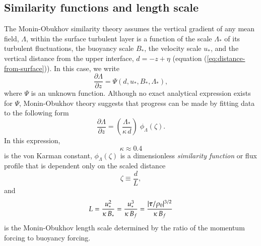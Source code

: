 \subsection{Similarity functions and length scale}
\label{subsection:m-o-similarity-functions}

The Monin-Obukhov similarity theory assumes the vertical gradient of
any mean field, $\Lambda$, within the surface turbulent layer is a
function of the scale $\Lambda_{*}$ of its turbulent fluctuations, the
buoyancy scale $B_{*}$, the velocity scale $u_{*}$, and the vertical
distance from the upper interface, $d=-z+\eta$ (equation
(\ref{eq:distance-from-surface})). In this case, we write
\begin{equation}
 \frac{\partial \Lambda}{\partial z} =  \Psi(d, u_{*}, B_{*}, \Lambda_{*}), 
\end{equation}
where $\Psi$ is an unknown function.  Although no exact analytical
expression exists for $\Psi$, Monin-Obukhov theory suggests that
progress can be made by fitting data to the following
form
\begin{equation}
  \frac{\partial \Lambda}{\partial z} = \left( \frac{\Lambda_{*}}{\kappa \, d} \right) \; \phi_{\Lambda}(\zeta).
\label{eq:m-o-similarity-form}
\end{equation}
In this expression, 
\begin{equation}
 \kappa \approx 0.4 
\label{eq:von-karman-constant}
\end{equation}
is the von Karman constant, $\phi_{\Lambda}(\zeta)$ is a dimensionless
{\it similarity function} or flux profile that is dependent only on
the scaled distance
\begin{equation}
  \zeta \equiv \frac{d}{L},
\label{eq:zeta-scaled-distance-defined}
\end{equation}
 and 
\begin{equation}
  L = \frac{u_{*}^{2}}{\kappa \, B_{*}} = \frac{u_{*}^{3}}{\kappa \, B_{f}} 
  = \frac{ |\mbox{\boldmath $\tau$}/\rho_{0}|^{3/2}}{\kappa \, B_{f}}
\label{eq:m-o-length-scale}
\end{equation}
is the Monin-Obukhov length scale determined by the ratio of the
momentum forcing to buoyancy forcing.

